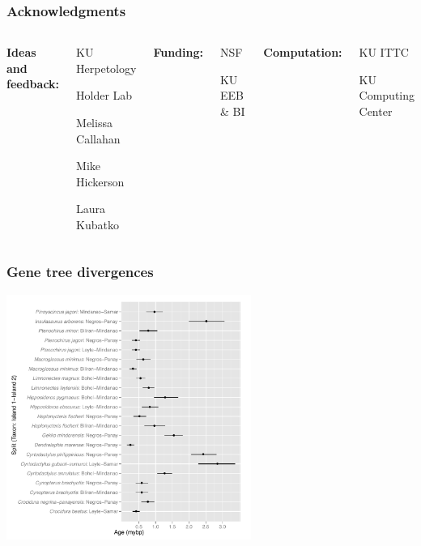 \begin{frame}
    \frametitle{Acknowledgments}
    \begin{columns}[c]
            {\bf Ideas and feedback:}
            \begin{myitemize}
                \item KU Herpetology
                \item Holder Lab
                \item Melissa Callahan
                \item Mike Hickerson
                \item Laura Kubatko
            \end{myitemize}
            {\bf Funding:}
            \begin{myitemize}
                \item NSF
                \item KU EEB \& BI
            \end{myitemize}
            {\bf Computation:}
            \begin{myitemize}
                \item KU ITTC
                \item KU Computing Center
            \end{myitemize}
    \end{columns}
\end{frame}


\begin{frame}[noframenumbering]
    \frametitle{Gene tree divergences}
    \centerline{
    \includegraphics[height=8cm]{images/gene_splits.pdf}}
\end{frame}

